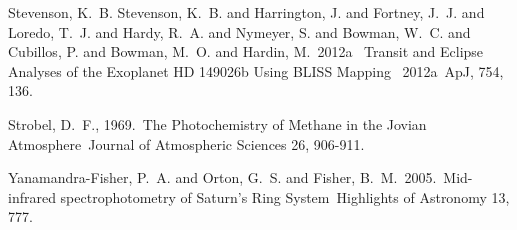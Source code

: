 \documentclass[preprint]{aastex}
\begin{document}
\begin{thebibliography}{28}
 Stevenson, K.~B. {Stevenson},
K.~B. and {Harrington}, J. and {Fortney}, J.~J. and {Loredo}, T.~J. and
{Hardy}, R.~A. and {Nymeyer}, S. and {Bowman}, W.~C. and {Cubillos}, P. and
{Bowman}, M.~O. and {Hardin}, M.\ 2012a \ Transit and Eclipse Analyses of the
Exoplanet HD 149026b Using BLISS Mapping \ 2012a\ ApJ, 754, 136.

 {Strobel}, D.~F., 1969.\ The
Photochemistry of Methane in the Jovian Atmosphere\ Journal of Atmospheric
Sciences 26, 906-911.

 {Yanamandra-Fisher},
P.~A. and {Orton}, G.~S. and {Fisher}, B.~M.\ 2005.\ Mid-infrared
spectrophotometry of Saturn's Ring System\ Highlights of Astronomy 13, 777.

\end{thebibliography}
\end{document}

